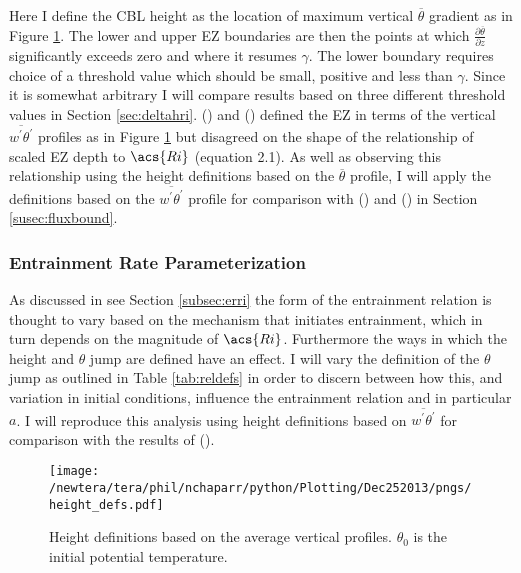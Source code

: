 Here I define the \acs{CBL} height as the location of maximum vertical $\overline{\theta}$ gradient as in Figure \ref{fig:hdefs}.  The lower and upper \acs{EZ} boundaries are then the points at which $\frac{\partial \overline{\theta}}{\partial z}$ significantly exceeds zero and where it resumes $\gamma$.  The lower boundary requires choice of a threshold value which should be small, positive and less than $\gamma$. Since it is somewhat arbitrary I will compare results based on three different threshold values in Section \ref{sec:deltahri}.  \citeauthor{FedConzMir04} (\citeyear{FedConzMir04}) and \citeauthor{BrooksFowler2} (\citeyear{BrooksFowler2}) defined the \acs{EZ} in terms of the vertical $\overline{w^{'}\theta^{'}}$ profiles as in Figure \ref{fig:hdefs} but disagreed on the shape of the relationship of scaled \acs{EZ} depth to $\acs{Ri}$ (equation 2.1).  As well as observing this relationship using the height definitions based on the $\overline{\theta}$ profile, I will apply the definitions based on the $\overline{w^{'}\theta^{'}}$ profile for comparison with \citeauthor{BrooksFowler2} (\citeyear{BrooksFowler2}) and \citeauthor{FedConzMir04} (\citeyear{FedConzMir04}) in Section \ref{susec:fluxbound}.\\  

\subsubsection{Entrainment Rate Parameterization}
As discussed in see Section \ref{subsec:erri} the form of the entrainment relation is thought to vary based on the mechanism that initiates entrainment, which in turn depends on the magnitude of $\acs{Ri}$.  Furthermore the ways in which the height and $\theta$ jump are defined have an effect. I will vary the definition of the $\theta$ jump as outlined in Table \ref{tab:reldefs} in order to discern between how this, and variation in initial conditions, influence the entrainment relation and in particular $a$. I will reproduce this analysis using height definitions based on $\overline{w^{'}\theta^{'}}$ for comparison with the results of \citeauthor{FedConzMir04} (\citeyear{FedConzMir04}).

\begin{figure}[htbp]
    \centering
    \texttt{[image: /newtera/tera/phil/nchaparr/python/Plotting/Dec252013/pngs/height\_defs.pdf]}
    \caption[Height Definitions]{Height definitions based on the average vertical profiles. $\theta_{0}$ is the initial potential temperature.}
    \label{fig:hdefs}   %
\end{figure}

